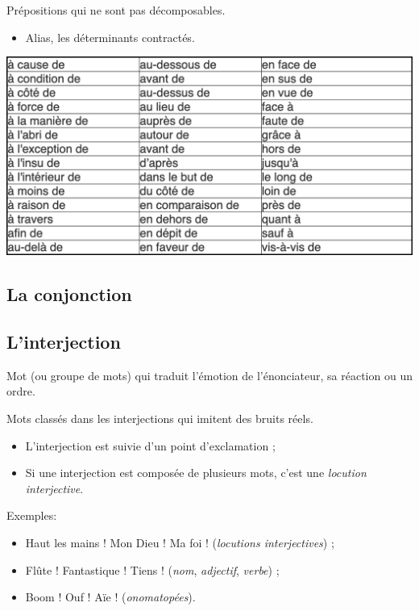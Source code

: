 \documentclass[10pt, french]{article}
\begin{document}
\begin{multicols*}{2}
\begin{definitionNOHFILLsub}
Prépositions qui ne sont pas décomposables.
\begin{itemize}
	\item	Alias, les déterminants contractés.
\end{itemize}
\begin{center}
	\includegraphics[width=0.9\columnwidth]{prep-compl}
\end{center}

\end{definitionNOHFILLsub}


\columnbreak
\subsection{La conjonction}


\columnbreak
\subsection{L'interjection}
\begin{definitionNOHFILL}[Interjection]
Mot (ou groupe de mots) qui traduit l'émotion de l'énonciateur, sa réaction ou un ordre.
\begin{definitionNOHFILL}[Onomatopées]
Mots classés dans les interjections qui imitent des bruits réels.
\end{definitionNOHFILL}
\begin{itemize}
	\item	L'interjection est suivie d'un point d'exclamation ;
	\item	Si une interjection est composée de plusieurs mots, c'est une \textit{locution interjective}.
\end{itemize}
\tcbline

Exemples:
\begin{itemize}
	\item	Haut les mains ! Mon Dieu ! Ma foi ! (\textit{locutions interjectives}) ;
	\item	Flûte ! Fantastique ! Tiens ! (\textit{nom}, \textit{adjectif}, \textit{verbe}) ;
	\item	Boom ! Ouf ! Aïe ! (\textit{onomatopées}).
\end{itemize}
\end{definitionNOHFILL}



\end{multicols*}
\end{document}
